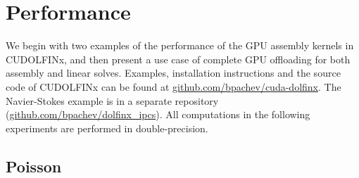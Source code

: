 \section*{Performance}

We begin with two examples of the performance of the GPU assembly kernels in CUDOLFINx, and then present a use case of complete GPU offloading for both assembly and linear solves. Examples, installation instructions and the source code of CUDOLFINx can be found at \href{https://github.com/bpachev/cuda-dolfinx}{github.com/bpachev/cuda-dolfinx}. The Navier-Stokes example is in a separate repository (\href{https://github.com/bpachev/dolfinx\_ipcs}{github.com/bpachev/dolfinx\_ipcs}). All computations in the following experiments are performed in double-precision.

\subsection*{Poisson}


